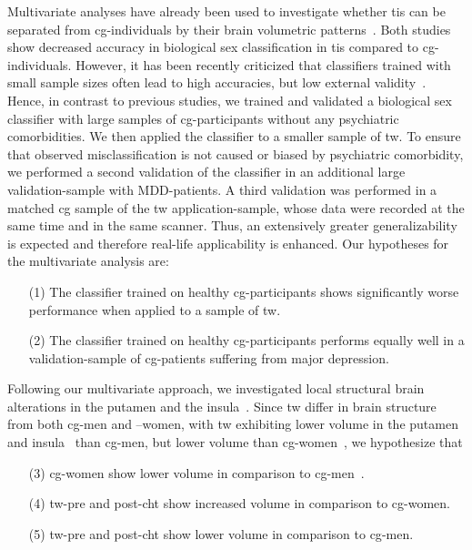 \documentclass{article}
\begin{document}
    Multivariate analyses have already been used to investigate whether \acp{ti} can be separated from \ac{cg}-individuals by their brain volumetric patterns~\cite{Hoekzema2015,Baldinger-Melich2019}. Both studies show decreased accuracy in biological sex classification in \acp{ti} compared to \ac{cg}-individuals. However, it has been recently criticized that classifiers trained with small sample sizes often lead to high accuracies, but low external validity~\cite{Varoquaux2018}. Hence, in contrast to previous studies, we trained and validated a biological sex classifier with large samples of \ac{cg}-participants without any psychiatric comorbidities. We then applied the classifier to a smaller sample of \ac{tw}. To ensure that observed misclassification is not caused or biased by psychiatric comorbidity, we performed a second validation of the classifier in an additional large validation-sample with MDD-patients. A third validation was performed in a matched \ac{cg} sample of the \ac{tw} application-sample, whose data were recorded at the same time and in the same scanner.
    Thus, an extensively greater generalizability is expected and therefore real-life applicability is enhanced.
    Our hypotheses for the multivariate analysis are:
    \begin{itemize}
        \item[(1)] The classifier trained on healthy \ac{cg}-participants shows significantly worse performance when applied to a sample of \ac{tw}.
        \item[(2)] The classifier trained on healthy \ac{cg}-participants performs equally well in a validation-sample of \ac{cg}-patients suffering from major depression.
    \end{itemize}
    Following our multivariate approach, we investigated local structural brain alterations in the putamen and the insula~\cite{Kranz2015, Burke2018, Spizzirri2018, Savic2011, Luders2009, Zubiaurre-Elorza2014}. Since \ac{tw} differ in brain structure from both \ac{cg}-men and –women, with \ac{tw} exhibiting lower volume in the putamen~\cite{Savic2011} and insula~\cite{Spizzirri2018} than \ac{cg}-men, but lower volume than \ac{cg}-women~\cite{Spizzirri2018, Simon2013, Luders2012}, we hypothesize that
    \begin{itemize}
        \item[(3)]    \ac{cg}-women show lower volume in comparison to \ac{cg}-men~\cite{Ruigrok2014}.
        \item[(4)]     \ac{tw}-pre and post-\ac{cht} show increased volume in comparison to \ac{cg}-women.
        \item[(5)]    \ac{tw}-pre and post-\ac{cht} show lower volume in comparison to \ac{cg}-men.
    \end{itemize}
\end{document}
